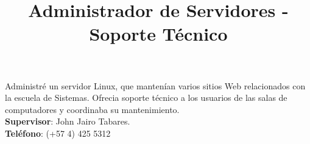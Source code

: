 \begin{resume}
\title{\textbf{Administrador de Servidores  - Soporte T\'{e}cnico}}
\begin{position}
Administr\'{e} un servidor Linux, que manten\'{i}an varios sitios Web relacionados con la escuela de Sistemas. Ofrecia 
soporte t\'{e}cnico a los usuarios de las salas de computadores y coordinaba su mantenimiento.\\
\textbf{Supervisor}:  John Jairo Tabares.\\
\textbf{Tel\'{e}fono}:  (+57 4) 425 5312 
\end{position}
\newline





 \begin{formatb}
   \\
   \body\\
 \end{formatb}



\end{resume}
